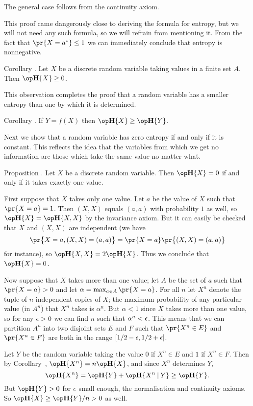 The general case follows from the continuity axiom.\slug

This proof came dangerously close to deriving the formula for entropy, but we will not need any such formula,
so we will refrain from mentioning it.
From the fact that $\pr\{X = a^*\} \le 1$ we can immediately conclude that entropy is nonnegative.

\edef\corentropynonneg{\the\sectcount.\the\thmcount}
\proclaim Corollary \advthm. Let $X$ be a discrete random variable taking values in a finite
set $A$. Then $\Eta\{X\} \ge 0$.\slug

This observation completes the proof that a random variable has a smaller entropy than one by which
it is determined.

\edef\cordetermines{\the\sectcount.\the\thmcount}
\proclaim Corollary \advthm. If $Y = f(X)$ then $\Eta\{X\} \ge \Eta\{Y\}$.\slug

Next we show that a random variable has zero entropy if and only if it is constant.
This reflects the idea that the variables from which we get no information are those which take
the same value no matter what.

\proclaim Proposition \advthm. Let $X$ be a discrete random variable.
Then $\Eta\{X\} = 0$ if and only if it takes exactly one value.

\proof First suppose that $X$ takes only one value.
Let $a$ be the value of $X$ such that $\pr\{X=a\} = 1$.
Then $(X,X)$ equals $(a,a)$ with probability $1$ as well,
so $\Eta\{X\} = \Eta\{X,X\}$ by the invariance axiom. But it can easily be checked that
$X$ and $(X,X)$ are independent (we have
$$\pr\bigl\{X = a, (X,X)= (a,a)\bigr\} = \pr\{X = a\}\pr\bigl\{(X,X) = (a,a)\bigr\}$$
for instance), so $\Eta\{X,X\} = 2\Eta\{X\}$. Thus we conclude
that $\Eta\{X\} = 0$.

Now suppose that $X$ takes more than one value; let $A$ be the set of $a$ such that
$\pr\{X = a\} > 0$ and let $\alpha = \max_{a\in A} \pr\{X = a\}$. For all $n$ let $X^n$ denote
the tuple of $n$ independent copies of $X$; the maximum probability of any particular value (in $A^n$)
that $X^n$ takes is $\alpha^n$. But $\alpha < 1$ since $X$ takes more than one value, so for any
$\epsilon > 0$ we can find $n$ such that $\alpha^n < \epsilon$. This means that we can partition $A^n$ into
two disjoint sets $E$ and $F$ such that $\pr\{X^n \in E\}$ and $\pr\{X^n \in F\}$ are both
in the range $[1/2-\epsilon, 1/2+\epsilon]$.

Let $Y$ be the random variable taking the value $0$ if $X^n\in E$ and $1$ if $X^n\in F$. Then
by Corollary~{\corxn}, $\Eta\{X^n\} = n\Eta\{X\}$, and since $X^n$ determines $Y$,
$$\Eta\{X^n\} = \Eta\{Y\} + \Eta\{X^n\given Y\} \ge \Eta\{Y\}.$$
But $\Eta\{Y\} > 0$ for $\epsilon$ small enough, the normalisation and continuity axioms. So
$\Eta\{X\} \ge \Eta\{Y\}/n > 0$ as well.\slug

